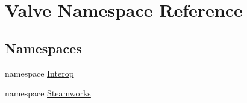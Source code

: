 \hypertarget{namespaceValve}{}\section{Valve Namespace Reference}
\label{namespaceValve}
\subsection*{Namespaces}
\begin{DoxyCompactItemize}
\item 
namespace \hyperlink{namespaceValve_1_1Interop}{Interop}
\item 
namespace \hyperlink{namespaceValve_1_1Steamworks}{Steamworks}
\end{DoxyCompactItemize}
